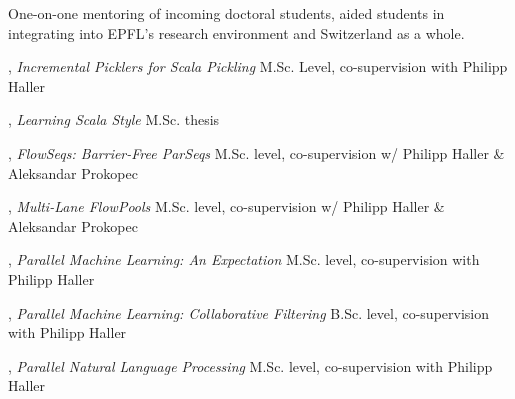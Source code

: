 \documentclass[9pt]{article}
\begin{document}
 
\newline\noindent One-on-one mentoring of incoming doctoral students, aided students in
\newline\noindent integrating into EPFL's research environment and Switzerland as a whole.
\vspace{0.05in}
\bigskip

\medskip
{}

, {\em Incremental Picklers for Scala Pickling} 
\newline\noindent M.Sc. Level, co-supervision with Philipp Haller
\medskip

, {\em Learning Scala Style} 
\newline\noindent M.Sc. thesis
\medskip

, {\em FlowSeqs: Barrier-Free ParSeqs} 
\newline\noindent M.Sc. level, co-supervision w/ Philipp Haller \& Aleksandar Prokopec
\medskip

, {\em Multi-Lane FlowPools} 
\newline\noindent M.Sc. level, co-supervision w/ Philipp Haller \& Aleksandar Prokopec
\medskip

, {\em Parallel Machine Learning: An Expectation} 
\newline{}
\newline\noindent M.Sc. level, co-supervision with Philipp Haller
\medskip

, {\em Parallel Machine Learning: Collaborative Filtering} 
\newline{}
\newline\noindent B.Sc. level, co-supervision with Philipp Haller
\medskip

, {\em Parallel Natural Language Processing} 
\newline{}
\newline\noindent M.Sc. level, co-supervision with Philipp Haller
\medskip
\end{document}
